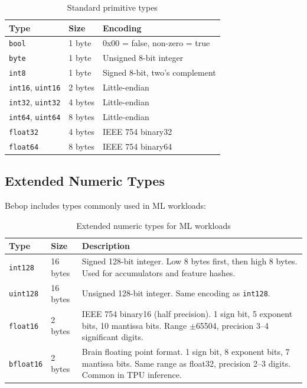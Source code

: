 \documentclass[11pt,onecolumn]{article}
\begin{document}
\begin{table}[ht]
\centering
\begin{tabular}{@{}lll@{}}
\toprule
\textbf{Type} & \textbf{Size} & \textbf{Encoding} \\
\midrule
\texttt{bool} & 1 byte & 0x00 = false, non-zero = true \\
\texttt{byte} & 1 byte & Unsigned 8-bit integer \\
\texttt{int8} & 1 byte & Signed 8-bit, two's complement \\
\texttt{int16}, \texttt{uint16} & 2 bytes & Little-endian \\
\texttt{int32}, \texttt{uint32} & 4 bytes & Little-endian \\
\texttt{int64}, \texttt{uint64} & 8 bytes & Little-endian \\
\texttt{float32} & 4 bytes & IEEE 754 binary32 \\
\texttt{float64} & 8 bytes & IEEE 754 binary64 \\
\bottomrule
\end{tabular}
\caption{Standard primitive types}
\label{tab:primitives}
\end{table}

\subsection{Extended Numeric Types}

Bebop includes types commonly used in ML workloads:

\begin{table}[ht]
\centering
\begin{tabular}{@{}llp{3.5in}@{}}
\toprule
\textbf{Type} & \textbf{Size} & \textbf{Description} \\
\midrule
\texttt{int128} & 16 bytes & Signed 128-bit integer. Low 8 bytes first, then high 8 bytes. Used for accumulators and feature hashes. \\[6pt]
\texttt{uint128} & 16 bytes & Unsigned 128-bit integer. Same encoding as \texttt{int128}. \\[6pt]
\texttt{float16} & 2 bytes & IEEE 754 binary16 (half precision). 1 sign bit, 5 exponent bits, 10 mantissa bits. Range $\pm$65504, precision 3--4 significant digits. \\[6pt]
\texttt{bfloat16} & 2 bytes & Brain floating point format. 1 sign bit, 8 exponent bits, 7 mantissa bits. Same range as float32, precision 2--3 digits. Common in TPU inference. \\
\bottomrule
\end{tabular}
\caption{Extended numeric types for ML workloads}
\label{tab:extended-types}
\end{table}
\end{document}
